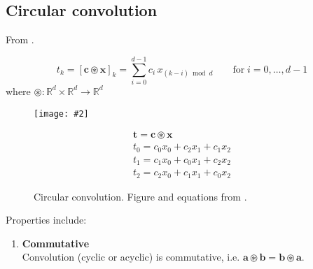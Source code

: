 \documentclass{article}
\makeatletter
\DeclareRobustCommand{\ie}{i.e.\@\xspace}
\newcommand{\tbf}[1]{\textbf{#1}}
\newcommand{\gph}[2]{\texttt{[image: \#2]}}
\makeatother
\begin{document}
\subsection{Circular convolution}
\label{subsec: Circular convolution}

From \cite{plate1995holographic,nickel2016holographic,dubois2017working}.

\begin{equation}
    t_k = \left[\mathbf{c} \circledast \mathbf{x}\right]_{k} = \sum_{i=0}^{d-1} c_{i} \, x_{(k-i) \bmod d} \qquad \text{for} \; i = 0, \dotsc, d-1
\end{equation}
\noindent
where $\circledast : \mathbb{R}^{d} \times \mathbb{R}^{d} \rightarrow \mathbb{R}^{d}$


\begin{figure}[h]
\begin{minipage}{0.5\linewidth}
    \begin{center}
    \gph{0.5}{images/circular_convolution.png}
    \end{center}
\end{minipage}
\begin{minipage}{0.5\linewidth}
    \begin{equation}
        \begin{array}{c}{\mathbf{t} = \mathbf{c} \circledast \mathbf{x}} \\ {t_{0}=c_{0} x_{0}+c_{2} x_{1}+c_{1} x_{2}} \\ {t_{1}=c_{1} x_{0}+c_{0} x_{1}+c_{2} x_{2}} \\ {t_{2}=c_{2} x_{0}+c_{1} x_{1}+c_{0} x_{2}}\end{array}
    \end{equation}
\end{minipage}
\caption{Circular convolution. Figure and equations from \cite{plate1995holographic}.}
\end{figure}

Properties include:

\begin{enumerate}[label=\roman*)]
    \item {\tbf{Commutative} \\
                Convolution (cyclic or acyclic) is commutative, \ie{} $\mathbf{a} \circledast \mathbf{b} = \mathbf{b} \circledast \mathbf{a}$.}
\end{enumerate}





\clearpage
\singlespacing


\end{document}
